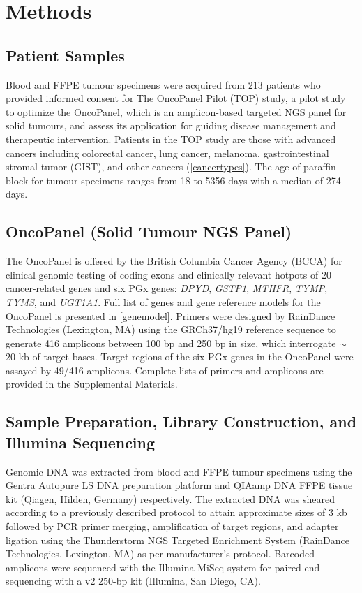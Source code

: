 \documentclass{bmcart}
\begin{document}

\section*{Methods}

\subsection*{Patient Samples}
Blood and FFPE tumour specimens were acquired from 213 patients who provided informed consent for The OncoPanel Pilot (TOP) study, a pilot study to optimize the OncoPanel, which is an amplicon-based targeted NGS panel for solid tumours, and assess its application for guiding disease management and therapeutic intervention. Patients in the TOP study are those with advanced cancers including colorectal cancer, lung cancer, melanoma, gastrointestinal stromal tumor (GIST), and other cancers (\autoref{cancertypes}). The age of paraffin block for tumour specimens ranges from 18 to 5356 days with a median of 274 days.

\subsection*{OncoPanel (Solid Tumour NGS Panel)}
The OncoPanel is offered by the British Columbia Cancer Agency (BCCA) for clinical genomic testing of coding exons and clinically relevant hotpots of 20 cancer-related genes and six PGx genes: \textit{DPYD}, \textit{GSTP1}, \textit{MTHFR}, \textit{TYMP}, \textit{TYMS}, and \textit{UGT1A1}. Full list of genes and gene reference models for the OncoPanel is presented in \autoref{genemodel}. Primers were designed by RainDance Technologies (Lexington, MA) using the GRCh37/hg19 reference sequence to generate 416 amplicons between 100 bp and 250 bp in size, which interrogate $\sim$ 20 kb of target bases. Target regions of the six PGx genes in the OncoPanel were assayed by 49/416 amplicons. Complete lists of primers and amplicons are provided in the Supplemental Materials.

\subsection*{Sample Preparation, Library Construction, and Illumina Sequencing}
Genomic DNA was extracted from blood and FFPE tumour specimens using the Gentra Autopure LS DNA preparation platform and QIAamp DNA FFPE tissue kit (Qiagen, Hilden, Germany) respectively. The extracted DNA was sheared according to a previously described protocol \cite{Bosdet2013} to attain approximate sizes of 3 kb followed by PCR primer merging, amplification of target regions, and adapter ligation using the Thunderstorm NGS Targeted Enrichment System (RainDance Technologies, Lexington, MA) as per manufacturer's protocol. Barcoded amplicons were sequenced with the Illumina MiSeq system for paired end sequencing with a v2 250-bp kit (Illumina, San Diego, CA).
\end{document}
